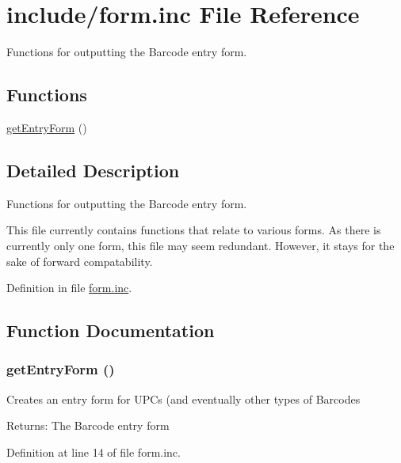 \hypertarget{form_8inc}{
\section{include/form.inc File Reference}
\label{form_8inc}
}
Functions for outputting the Barcode entry form. 

\subsection*{Functions}
\begin{CompactItemize}
\item 
\hyperlink{form_8inc_839e205cae656bea01ea99e2de94ef1e}{getEntryForm} ()
\end{CompactItemize}


\subsection{Detailed Description}
Functions for outputting the Barcode entry form. 

This file currently contains functions that relate to various forms. As there is currently only one form, this file may seem redundant. However, it stays for the sake of forward compatability. 

Definition in file \hyperlink{form_8inc-source}{form.inc}.

\subsection{Function Documentation}
\hypertarget{form_8inc_839e205cae656bea01ea99e2de94ef1e}{
\subsubsection{\setlength{\rightskip}{0pt plus 5cm}getEntryForm ()}}
\label{form_8inc_839e205cae656bea01ea99e2de94ef1e}


Creates an entry form for UPCs (and eventually other types of Barcodes \begin{Desc}
\item[Returns:]The Barcode entry form \end{Desc}


Definition at line 14 of file form.inc.

